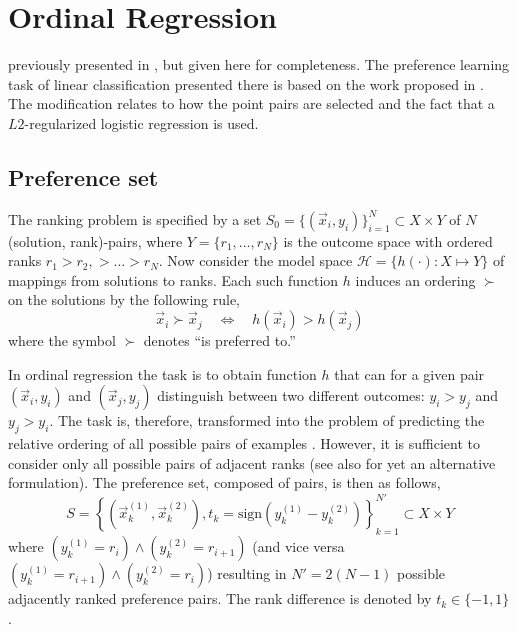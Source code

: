 
\chapter{Ordinal Regression}\label{ch:ordinal} 
 previously presented in \cite{Ru06:PPSN}, but given here for completeness. The preference learning task of linear classification presented there is based on the work proposed in \citep{liblinear,Lin08:newtontrustregion}. The modification relates to how the point pairs are selected and the fact that a $L2$-regularized logistic regression is used. 

\section{Preference set}
The ranking problem is specified by a set $S_{0} = \{(\vec{x}_i,y_i)\}_{i=1}^N \subset X \times Y$ of $N$ (solution, rank)-pairs, where $Y=\{r_1,\ldots,r_N\}$ is the outcome space with ordered ranks $r_1> r_2,> \ldots > r_N$.  
Now consider the model space $\mathcal{H} = \{h(\cdot) : X \mapsto Y\}$ of mappings from solutions to ranks. Each such function $h$ induces an ordering $\succ$ on the solutions  by the following rule,
\begin{equation}\label{eq:linear}
\vec{x}_i \succ \vec{x}_j \quad \Leftrightarrow \quad h(\vec{x}_i) > h(\vec{x}_j)
\end{equation}
where the symbol $\succ$ denotes ``is preferred to.''  

In ordinal regression the task is to obtain function $h$ that can for a given pair $(\vec{x}_i,y_i)$ and $(\vec{x}_j,y_j)$ distinguish between two different outcomes: $y_i > y_j$ and $y_j > y_i$. The task is, therefore, transformed into the problem of predicting the relative ordering of all possible pairs of examples \citep{Herbrich00,Joachims02}.  However, it is sufficient to consider only all possible pairs of adjacent ranks (see also \cite{ShaweTaylor04:book} for yet an alternative formulation).  The preference set, composed of pairs, is then as follows,
\begin{equation}
S = \left\{(\vec{x}_k^{(1)}, \vec{x}_k^{(2)}),t_k=\text{sign}(y_k^{(1)} - y_k^{(2)})\right\}_{k=1}^{N'} \subset X\times Y  \label{eq:S}
\end{equation}
where $(y_k^{(1)} = r_i) \wedge (y_k^{(2)} = r_{i+1})$ (and vice versa $(y_k^{(1)} = r_{i+1}) \wedge (y_k^{(2)} = r_{i})$) resulting in $N'=2(N-1)$ possible adjacently ranked preference pairs. The rank difference is denoted by $t_k\in\{-1,1\}$.


